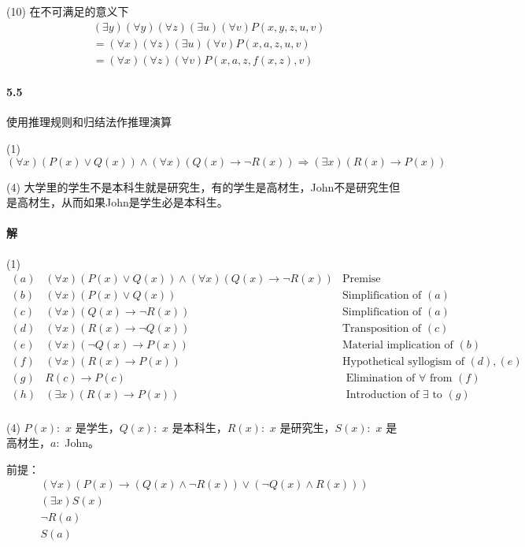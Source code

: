 \documentclass[hyperref, UTF8]{ctexart}
\begin{document}
(10) 在不可满足的意义下
\begin{align*}
    & ( \exists y) ( \forall y) ( \forall z) ( \exists u) ( \forall v)P(x,y,z,u,v) \\
    &= ( \forall x) ( \forall z) ( \exists u) ( \forall v)P(x,a,z,u,v) \\
    &= ( \forall x) ( \forall z) ( \forall v)P(x,a,z,f(x,z),v)
\end{align*}

\paragraph{5.5}\label{5.5}
使用推理规则和归结法作推理演算

(1) $ ( \forall x)(P(x) \lor Q(x)) \land ( \forall x)(Q(x) \rightarrow \lnot R(x)) \Rightarrow ( \exists x)(R(x) \rightarrow P(x)) $

(4) 大学里的学生不是本科生就是研究生，有的学生是高材生，John不是研究生但是高材生，从而如果John是学生必是本科生。

\paragraph{解}
(1)
\begin{align*}
    (a) & ( \forall x)(P(x) \lor Q(x)) \land ( \forall x)(Q(x) \rightarrow \lnot R(x)) & \text{Premise} \\
    (b) & ( \forall x)(P(x) \lor Q(x)) & \text{Simplification of } (a) \\
    (c) & ( \forall x)(Q(x) \rightarrow \lnot R(x)) & \text{Simplification of } (a) \\
    (d) & ( \forall x)(R(x) \rightarrow \lnot Q(x)) & \text{Transposition of }(c) \\
    (e) & ( \forall x)(\lnot Q(x) \rightarrow P(x)) & \text{Material implication of } (b) \\
    (f) & ( \forall x)(R(x) \rightarrow P(x)) & \text{Hypothetical syllogism of } (d),(e) \\
    (g) & R(c) \rightarrow P(c) & \text{ Elimination of } \forall \text{ from } (f)\\
    (h) & ( \exists x)(R(x) \rightarrow P(x)) & \text{ Introduction of } \exists \text{ to } (g) \\
\end{align*}

(4) $P(x): $ $x$ 是学生，$Q(x): $ $x$ 是本科生，$R(x): $ $x$ 是研究生，$S(x): $ $x$ 是高材生，$a: $ John。

前提：
\begin{align*}
    ( \forall x)(P(x) \rightarrow (Q(x) \land \lnot R(x)) \lor (\lnot Q(x) \land R(x))) \\
    ( \exists x)S(x) \\
    \lnot R(a) \\
    S(a)
\end{align*}
\end{document}
